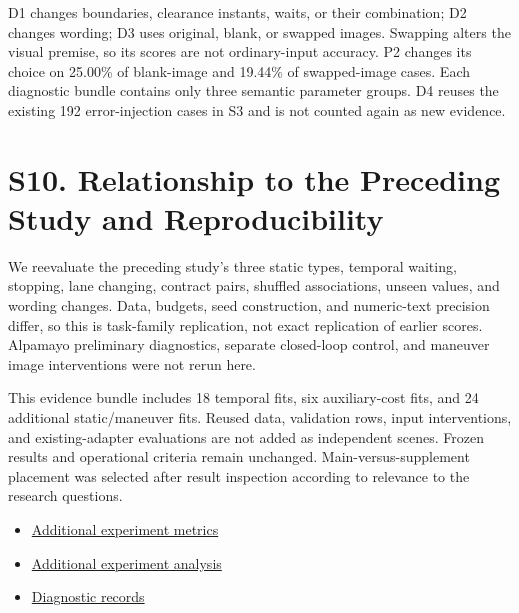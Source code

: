 \documentclass[11pt,a4paper]{article}
\begin{document}
D1 changes boundaries, clearance instants, waits, or their combination; D2 changes wording; D3 uses original, blank, or swapped images. Swapping alters the visual premise, so its scores are not ordinary-input accuracy. P2 changes its choice on 25.00\% of blank-image and 19.44\% of swapped-image cases. Each diagnostic bundle contains only three semantic parameter groups. D4 reuses the existing 192 error-injection cases in S3 and is not counted again as new evidence.\par

\section*{S10. Relationship to the Preceding Study and Reproducibility}

We reevaluate the preceding study's three static types, temporal waiting, stopping, lane changing, contract pairs, shuffled associations, unseen values, and wording changes. Data, budgets, seed construction, and numeric-text precision differ, so this is task-family replication, not exact replication of earlier scores. Alpamayo preliminary diagnostics, separate closed-loop control, and maneuver image interventions were not rerun here.\par

This evidence bundle includes 18 temporal fits, six auxiliary-cost fits, and 24 additional static/maneuver fits. Reused data, validation rows, input interventions, and existing-adapter evaluations are not added as independent scenes. Frozen results and operational criteria remain unchanged. Main-versus-supplement placement was selected after result inspection according to relevance to the research questions.\par

\begin{itemize}\setlength{\itemsep}{0pt}\setlength{\parsep}{0pt}\setlength{\topsep}{2pt}
\item \href{\detokenize{projects/04-guardsynth-coc/artifacts/public/paper1-method-preservation-001/experiments-section-2026-09-30-003/multitask_metrics.csv}}{Additional experiment metrics}
\item \href{\detokenize{projects/04-guardsynth-coc/artifacts/public/paper1-method-preservation-001/multitask-contract-analysis-2026-09-30-001/REPORT_KO.md}}{Additional experiment analysis}
\item \href{\detokenize{projects/04-guardsynth-coc/artifacts/public/paper1-temporal-diversity-001/expanded-diagnostics-analysis-2026-09-30-001/RESULT.json}}{Diagnostic records}
\end{itemize}
\clearpage
\end{document}

